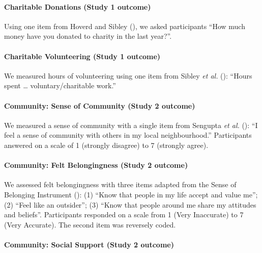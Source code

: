 \documentclass[
  single column]{article}
\let\oldparagraph\paragraph
\renewcommand{\paragraph}[1]{\oldparagraph{#1}\mbox{}}
\begin{document}
\paragraph{Charitable Donations (Study 1
outcome)}\label{charitable-donations-study-1-outcome}

Using one item from Hoverd and Sibley
(), we asked participants
``How much money have you donated to charity in the last year?''.

\paragraph{Charitable Volunteering (Study 1
outcome)}\label{charitable-volunteering-study-1-outcome}

We measured hours of volunteering using one item from Sibley \emph{et
al.} (): ``Hours spent \ldots{}
voluntary/charitable work.''

\paragraph{Community: Sense of Community (Study 2
outcome)}\label{community-sense-of-community-study-2-outcome}

We measured a sense of community with a single item from Sengupta
\emph{et al.} (): ``I feel a sense of
community with others in my local neighbourhood.'' Participants answered
on a scale of 1 (strongly disagree) to 7 (strongly agree).

\paragraph{Community: Felt Belongingness (Study 2
outcome)}\label{community-felt-belongingness-study-2-outcome}

We assessed felt belongingness with three items adapted from the Sense
of Belonging Instrument (): (1) ``Know that people in my life accept and value me''; (2)
``Feel like an outsider''; (3) ``Know that people around me share my
attitudes and beliefs''. Participants responded on a scale from 1 (Very
Inaccurate) to 7 (Very Accurate). The second item was reversely coded.

\paragraph{Community: Social Support (Study 2
outcome)}\label{community-social-support-study-2-outcome}
\end{document}
